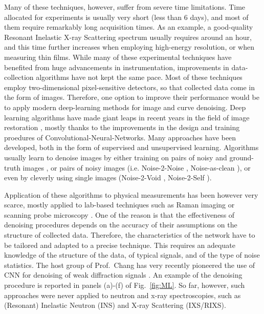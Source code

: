 \documentclass[a4paper, 12pt]{article}
\begin{document}
Many of these techniques, however, suffer from severe time limitations. Time allocated for experiments is usually very short (less than 6 days), and most of them require remarkably long acquisition times. As an example, a good-quality  Resonant Inelastic X-ray Scattering spectrum usually requires around an hour, and this time further increases when employing high-energy resolution, or when measuring thin films.
While many of these experimental techniques have benefited from huge advancements in instrumentation, improvements in data-collection algorithms have not kept the same pace. Most of these techniques employ two-dimensional pixel-sensitive detectors, so that collected data come in the form of images. Therefore, one option to improve their performance would be to apply modern deep-learning methods for image and curve denoising. Deep learning algorithms have made giant leaps in recent years in the field of image restoration \cite{zhang2017beyond, tian2020deep}, mostly thanks to the improvements in the design and training proedures of Convolutional-Neural-Networks. Many approaches have been developed, both in the form of supervised and unsupervised learning. Algorithms usually learn to denoise images by either training on pairs of noisy and ground-truth images \cite{zhang2017beyond, zhang2018FFDNet}, or pairs of noisy images (i.e. Noise-2-Noise \cite{lehtinen2018noise2noise}, Noise-as-clean \cite{xu2020noisy}), or even by cleverly using single images (Noise-2-Void \cite{Krull2019CVPR}, Noise-2-Self \cite{batson2019noise2self}).


Application of these algorithms to physical measurements has been however very scarce, mostly applied to lab-based techniques such as Raman imaging \cite{valensise2020removing} or scanning probe microscopy \cite{borodinov2019deep}. One of the reason is that the effectiveness of denoising procedures depends on the accuracy of their assumptions on the structure of collected data. Therefore, the characteristics of the network have to be tailored and adapted to a precise technique. This requires an adequate knowledge of the structure of the data, of typical signals, and of the type of noise statistics.
The host group of Prof.~Chang has very recently pioneered the use of CNN for denoising of weak diffraction signals \cite{oppliger2022weak}. An example of the denoising procedure is reported in panels (a)-(f) of Fig.~\ref{fig:ML}. So far, however, such approaches were never applied to neutron and x-ray spectroscopies, such as (Resonant) Inelastic Neutron (INS) and X-ray Scattering (IXS/RIXS). 
\end{document}
